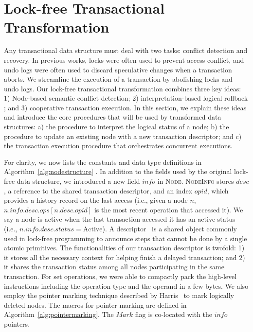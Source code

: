 \documentclass[]{sig-alternate-05-2015}
\begin{document}
\section{Lock-free Transactional Transformation}
\label{sec:algorithm}
Any transactional data structure must deal with two tasks: conflict detection and recovery.
In previous works, locks were often used to prevent access conflict, and undo logs were often used to discard speculative changes when a transaction aborts.
We streamline the execution of a transaction by abolishing locks and undo logs.
Our lock-free transactional transformation combines three key ideas: 1) Node-based semantic conflict detection; 2) interpretation-based logical rollback ; and 3) cooperative transaction execution.
In this section, we explain these ideas and introduce the core procedures that will be used by transformed data structures: a) the procedure to interpret the logical status of a node; b) the procedure to update an existing node with a new transaction descriptor; and c) the transaction execution procedure that orchestrates concurrent executions.

For clarity, we now lists the constants and data type definitions in Algorithm~\ref{alg:nodestructure} .
In addition to the fields used by the original lock-free data structure, we introduced a new field $info$ in \textsc{Node}.
\textsc{NodeInfo} stores $desc$, a reference to the shared transaction descriptor, and an index $opid$, which provides a history record on the last access (i.e., given a node $n$, $n.info.desc.ops[n.desc.opid]$ is the most recent operation that accessed it).
We say a node is active when the last transaction accessed it has an active status (i.e., $n.info.desc.status=\text{Active}$).
A descriptor~\cite{herlihy2012art} is a shared object commonly used in lock-free programming to announce steps that cannot be done by a single atomic primitives.
The functionalities of our transaction descriptor is twofold: 1) it stores all the necessary context for helping finish a delayed transaction; and 2) it shares the transaction status among all nodes participating in the same transaction.
For set operations, we were able to compactly pack the high-level instructions including the operation type and the operand in a few bytes.
We also employ the pointer marking technique described by Harris~\cite{harris2001pragmatic} to mark logically deleted nodes. 
The macros for pointer marking are defined in Algorithm~\ref{alg:pointermarking}.
The $Mark$ flag is co-located with the $info$ pointers.
\end{document}
